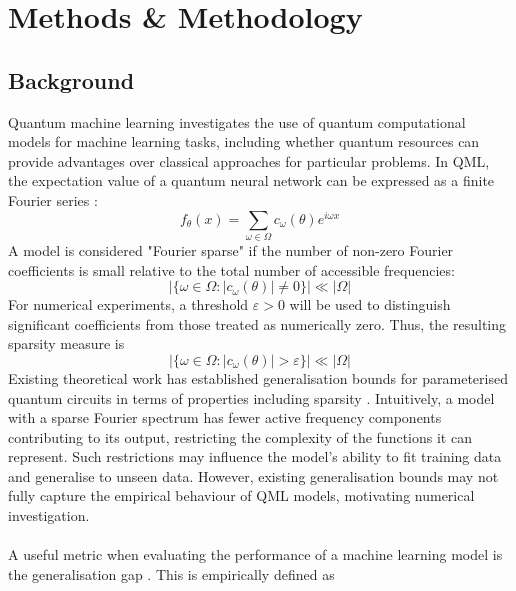 
\section{Methods \& Methodology}
\label{sec:MethodsAndMethodology}

\subsection{Background}
{\large
\raggedright

Quantum machine learning investigates the use of quantum computational models for machine learning tasks, including whether quantum resources can provide advantages over classical approaches for particular problems. In QML, the expectation value of a quantum neural network can be expressed as a finite Fourier series \cite{Schuld21}:
\begin{equation}
    f_{\theta}(x)=\sum_{\omega \in \Omega}c_{\omega}(\theta)e^{i \omega x}
\end{equation}
A model is considered "Fourier sparse" if the number of non-zero Fourier coefficients is small relative to the total number of accessible frequencies:
\begin{equation}
    |\{\omega \in \Omega : | c_{\omega}(\theta) | \neq 0\}| \ll |\Omega|
\end{equation}
For numerical experiments, a threshold $\varepsilon > 0$ will be used to distinguish significant coefficients from those treated as numerically zero. Thus, the resulting sparsity measure is
\begin{equation}
    |\{\omega \in \Omega : | c_{\omega}(\theta) | > \varepsilon \}| \ll |\Omega|
\end{equation}
Existing theoretical work has established generalisation bounds for parameterised quantum circuits in terms of properties including sparsity \cite{Caro21}. Intuitively, a model with a sparse Fourier spectrum has fewer active frequency components contributing to its output, restricting the complexity of the functions it can represent. Such restrictions may influence the model's ability to fit training data and generalise to unseen data. However, existing generalisation bounds may not fully capture the empirical behaviour of QML models, motivating numerical investigation.\\
~\\
A useful metric when evaluating the performance of a machine learning model is the generalisation gap \cite{RodriguezGrasa26}. This is empirically defined as
}
